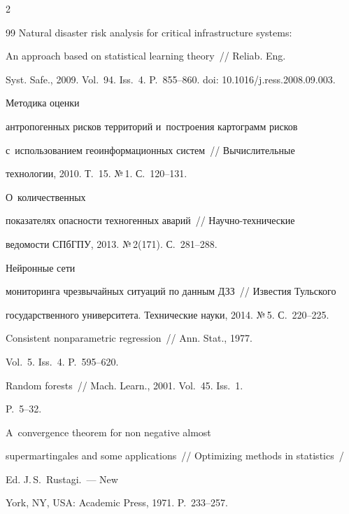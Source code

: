 \begin{multicols}{2}
{{\begin{thebibliography}{99}
 Natural disaster risk analysis for critical infrastructure systems: 


An approach based on statistical learning theory~// Reliab. Eng. 


Syst. Safe., 2009. Vol.~94. Iss.~4. P.~855--860. doi: 10.1016/j.ress.2008.09.003.




 Методика оценки 


антропогенных рисков территорий и~построения картограмм рисков 


с~использованием геоинформационных сис\-тем~// Вычислительные 


технологии, 2010. Т.~15. №\,1. С.~120--131. 




 О~количественных 


показателях опасности техногенных аварий~// На\-уч\-но-тех\-ни\-че\-ские 


ведомости СПбГПУ, 2013. №\,2(171). С.~281--288.




 Нейронные сети 


мониторинга чрезвычайных ситуаций по данным ДЗЗ~// Известия Тульского 


государственного университета. Технические науки, 2014. №\,5. С.~220--225.




 Consistent nonparametric regression~// Ann. Stat., 1977. 


Vol.~5. Iss.~4. P.~595--620.




 Random forests~// Mach. Learn., 2001. Vol.~45. Iss.~1. 


P.~5--32.




 A~convergence theorem for non negative almost 


supermartingales and some applications~// Optimizing methods in statistics~/


Ed. J.\,S.~Rustagi.~--- New 


York, NY, USA: Academic Press, 1971. P.~233--257.





\end{thebibliography}}}
\end{multicols}
